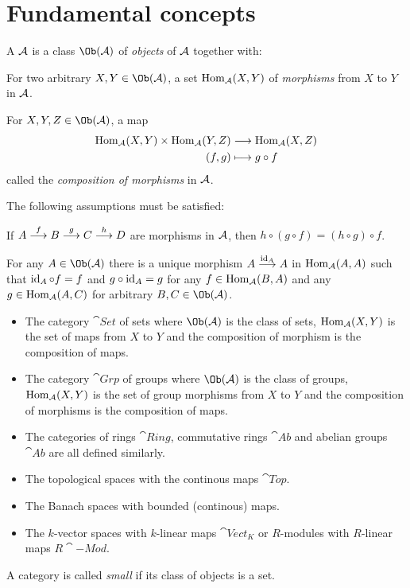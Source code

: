 \documentclass[a4paper,parskip=half,numbers=enddot, DIV=12]{scrreprt}
\begin{document}
\section{Fundamental concepts}
\begin{defi}[category]
	A  $\mathcal{A}$ is a class $\Ob(\Aa)$ of \emph{objects} of $\mathcal{A}$ together with:
	\begin{alphanumerate}
	    \item 
	        For two arbitrary $X,Y\in \Ob(\Aa)$, a set $\operatorname{Hom}_{\mathcal{A}}(X,Y)$ of \emph{morphisms} from $X$ to $Y$ in $\mathcal{A}$.
	    \item 
	        For $X,Y,Z\in\Ob(\Aa)$, a map 
	        \begin{align*}
	            \operatorname{Hom}_{\mathcal{A}}(X,Y)\times \operatorname{Hom}_{\mathcal{A}}(Y,Z) &\longrightarrow \operatorname{Hom}_{\mathcal{A}}(X,Z)\\
	            (f,g) &\longmapsto g\circ f
	        \end{align*}
	        called the \emph{composition of morphisms} in $\mathcal{A}$.
	\end{alphanumerate}
	The following assumptions must be satisfied:
	\begin{rmnumerate}
	    \item
	        If $A\morphism[f] B \morphism[g] C\morphism[h] D$ are morphisms in $\mathcal{A}$, then $h\circ(g\circ f) = (h\circ g)\circ f$.
	    \item
	        For any $A\in\Ob(\Aa)$ there is a unique morphism $A\morphism[\id_A] A$ in $\operatorname{Hom}_{\mathcal{A}}(A,A)$ such that $\operatorname{id}_A \circ f = f$ and $g\circ \operatorname{id}_A = g$ for any $f\in \operatorname{Hom}_{\mathcal{A}}(B,A)$ and any $g\in \operatorname{Hom}_{\mathcal{A}}(A,C)$ for arbitrary $B,C\in \Ob(\Aa)$.
	\end{rmnumerate}
\end{defi}
\begin{example}
    \begin{itemize}
        \item 
            The category $\cat{Set}$ of sets where $\Ob(\Aa)$ is the class of sets, $\operatorname{Hom}_{\mathcal{A}}(X,Y)$ is the set of maps from $X$ to $Y$ and the composition of morphism is the composition of maps.
        \item 
            The category $\cat{Grp}$ of groups where $\Ob(\Aa)$ is the class of groups, $\operatorname{Hom}_{\mathcal{A}}(X,Y)$ is the set of group morphisms from $X$ to $Y$ and the composition of morphisms is the composition of maps.
        \item 
            The categories of rings $\cat{Ring}$, commutative rings $\cat{Ab}$ and abelian groups $\cat{Ab}$ are all defined similarly.
        \item 
            The topological spaces with the continous maps $\cat{Top}$.
        \item 
            The Banach spaces with bounded (continous) maps.
        \item 
            The $k$-vector spaces with $k$-linear maps $\cat{Vect}_K$ or $R$-modules with $R$-linear maps $R\cat{-Mod}$.
    \end{itemize}
\end{example}
A category is called \emph{small} if its class of objects is a set.
\end{document}
